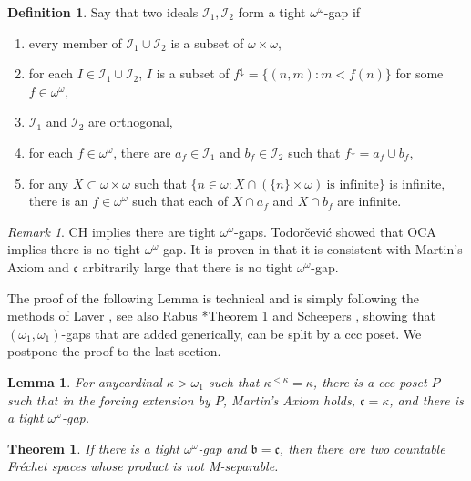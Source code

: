 \documentclass{amsart}
\newtheorem{theorem}[thm]{Theorem}
\newtheorem{lemma}[thm]{Lemma}
\theoremstyle{definition}
\newtheorem{definition}[thm]{Definition}
\theoremstyle{remark}
\newtheorem{remark}{Remark}[section]
\begin{document}
\begin{definition} Say that two ideals $\mathcal I_1, \mathcal I_2$
form a tight  $\omega^\omega$-gap if 
\begin{enumerate}
\item every member of $\mathcal I_1\cup \mathcal I_2$ is a subset
of $\omega\times\omega$,
\item for each $I\in \mathcal I_1\cup \mathcal I_2$, $I$ is a subset
of $f^{\downarrow}  = \{ (n,m) : m < f(n)\}$    for some
 $f\in \omega^\omega$, 
\item $\mathcal I_1$ and $\mathcal I_2$ are orthogonal,
\item  for each $f\in \omega^\omega$, there are $a_f\in\mathcal I_1$
and $b_f\in \mathcal I_2$ such that $f^{\downarrow}= a_f\cup b_f$,
\item for any $X\subset \omega\times\omega$ such that
 $\{ n\in\omega : X\cap (\{n\}\times\omega)\ \mbox{is infinite}\}$
 is infinite, 
there is an $f\in \omega^\omega$ such that each of
 $X\cap a_f$ and $X\cap b_f$ are infinite.
\end{enumerate}
\end{definition}

\begin{remark}  CH implies there are tight $\omega^\omega$-gaps.
Todor\v{c}evi\'{c} \cite{StevoPPT} showed that OCA implies
there is no tight $\omega^\omega$-gap.
It is proven in \cite{Dow2025} that it is consistent with
 Martin's Axiom and $\mathfrak c$ arbitrarily large that there is
 no tight $\omega^\omega$-gap.  
\end{remark}

 

 The proof of the following Lemma 
 is technical and is simply following the methods of Laver \cite{Laver},
  see also Rabus \cite{Rabus}*{Theorem 1}
  and Scheepers \cite{Scheepers}, showing that $(\omega_1,\omega_1)$-gaps
  that are added generically, can be split by a ccc poset.
  We postpone the proof to the last section.


\begin{lemma} For any\label{tight}
cardinal $\kappa >\omega_1$ such that $\kappa^{<\kappa}=\kappa$,
there is a ccc poset $P$ such that in the forcing extension by $P$,
Martin's Axiom holds, $\mathfrak c=\kappa$, and 
there is a tight $\omega^\omega$-gap. 
\end{lemma}

\begin{theorem} If there is a tight $\omega^\omega$-gap and $\mathfrak b = \mathfrak c$,
 then there are two countable Fr\'echet spaces whose product is not M-separable.
\end{theorem}
\end{document}
